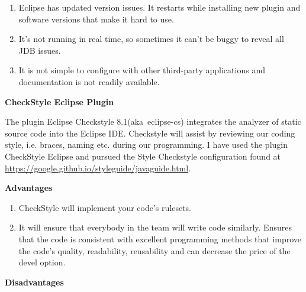 \documentclass[12pt]{article}
\begin{document}
\begin{enumerate}
	\item Eclipse has updated version issues. It restarts while installing new plugin and software versions that make it hard to use.\par

	\item It's not running in real time, so sometimes it can't be buggy to reveal all JDB issues.\par

	\item It is not simple to configure with other third-party applications and documentation is not readily available.
\end{enumerate}\par


\vspace{\baselineskip}
{\fontsize{14pt}{16.8pt}\selectfont \textbf{CheckStyle Eclipse Plugin}\par}\par


\vspace{\baselineskip}
 The plugin Eclipse Checkstyle 8.1(aka\ eclipse-cs) integrates the analyzer of static source code into the Eclipse IDE.  Checkstyle will assist by reviewing our coding style, i.e. braces, naming etc. during our programming. I have used the plugin CheckStyle Eclipse and pursued the Style Checkstyle configuration found at \href{https://google.github.io/styleguide/javaguide.html}{https://google.github.io/styleguide/javaguide.html}.\par


\vspace{\baselineskip}
\textbf{Advantages}\par

\begin{enumerate}
	\item CheckStyle will implement your code's rulesets.\par

	\item It will ensure that everybody in the team will write code similarly. Ensures that the code is consistent with excellent programming methods that improve the code's quality, readability, reusability and can decrease the price of the devel option.
\end{enumerate}\par


\vspace{\baselineskip}
\textbf{Disadvantages}\par
\end{document}
